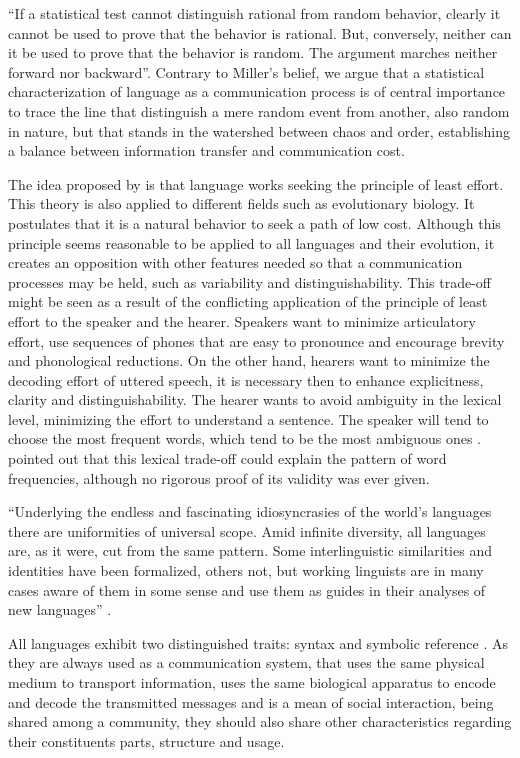 ``If a statistical test cannot distinguish rational from random behavior, clearly it cannot 
be used to prove that the behavior is rational. But, conversely, neither can it be used to 
prove that the behavior is random. The argument marches neither forward nor backward''\citep{miller1965}.
Contrary to Miller's belief, we argue that a statistical characterization of language as 
a communication process is of central importance to trace the line that distinguish a
mere random event from another, also random in nature, but that stands in the watershed
between chaos and order, establishing a balance between information transfer and communication cost. 


The idea proposed by \cite{zipf1949} is that language works seeking the principle of least effort. 
This theory is also applied to different fields such as evolutionary biology. It postulates that
it is a natural behavior to seek a path of low cost.
Although this principle seems reasonable to be applied to all languages and their evolution,
it creates an opposition with other features needed so that a communication processes may be held,
such as variability and distinguishability. This trade-off might be seen as a result of the conflicting
application of the principle of least effort to the speaker and the hearer. Speakers want to 
minimize articulatory effort, use sequences of phones that are easy to pronounce and encourage
brevity and phonological reductions. On the other hand, hearers want to minimize the decoding effort
of uttered speech, it is necessary then to enhance explicitness, clarity and distinguishability.
The hearer wants to avoid ambiguity in the lexical level, minimizing the effort to understand a sentence.
The speaker will tend to choose the most frequent words, which tend to be the most ambiguous ones
\citep{gernsbacher1994, kohler1986}.
\cite{zipf1949} pointed out that this lexical trade-off could explain the pattern of word frequencies,
although no rigorous proof of its validity was ever given.
 

``Underlying the endless and fascinating idiosyncrasies of the world's languages there are 
uniformities of universal scope. Amid infinite diversity, all languages are, as it were, 
cut from the same pattern. Some interlinguistic similarities and identities have been formalized, 
others not, but working linguists are in many cases aware of them in some sense and use them as 
guides in their analyses of new languages'' \citep{greenberg1966}.

All languages exhibit two distinguished traits: syntax and symbolic reference
\citep{chomsky1968b, deacon1997}.
As they are always used as a communication system, that uses the same physical medium to 
transport information, uses the same biological apparatus to encode and decode the transmitted
messages and is a mean of social interaction, being shared among a community, they should also 
share other characteristics regarding their constituents parts, structure and usage.


